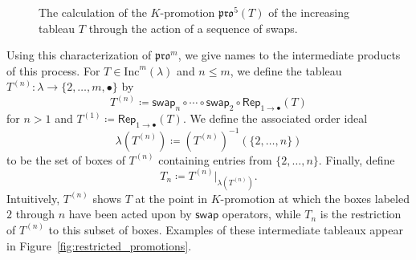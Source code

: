 \documentclass[12pt]{amsart}
\theoremstyle{definition}
\theoremstyle{remark}
\numberwithin{equation}{section}
\newcommand{\inc}{\ensuremath{\mathrm{Inc}}}
\newcommand{\pro}{\mathfrak{pro}}
\newcommand{\swap}{\ensuremath{\mathsf{swap}}}
\newcommand{\decr}{\ensuremath{\mathsf{Decr}}}
\newcommand{\rep}{\ensuremath{\mathsf{Rep}}}
\begin{document}
 \begin{figure}[h]
\caption{The calculation of the $K$-promotion $\pro^5(T)$ of the increasing tableau $T$ through the action of a sequence of swaps.}\label{fig:promotion_via_swaps}
 \end{figure}

Using this characterization of $\pro^m$, we give names to the intermediate products of this process.
For $T \in \inc^m(\lambda)$ and $n \leq m$, we define the tableau $T^{(n)}: \lambda \rightarrow \lbrace 2, \dots, m, \bullet \rbrace$ by 
\[T^{(n)} \coloneqq \swap_n \circ \cdots \circ \swap_2 \circ \rep_{1 \rightarrow \bullet}(T)\] for $n > 1$ and $T^{(1)} \coloneqq \rep_{1 \rightarrow \bullet}(T)$. We define the associated order ideal 
\[
\lambda \left( T^{(n)} \right) \coloneqq \left( T^{(n)} \right)^{-1}(\{2,\dots,n\})
\]
 to be the set of boxes of $T^{(n)}$ containing entries from $\{2,\dots,n\}$. Finally, define 
 \[
 T_n \coloneqq T^{(n)} \vert_{\lambda \left( T^{(n)} \right) }.
 \]
  Intuitively, $T^{(n)}$ shows $T$ at the point in $K$-promotion at which the boxes labeled $2$ through $n$ have been acted upon by $\swap$ operators, while $T_n$ is the restriction of $T^{(n)}$ to this subset of boxes. Examples of these intermediate tableaux appear in Figure~\ref{fig:restricted_promotions}. 
  
\end{document}
